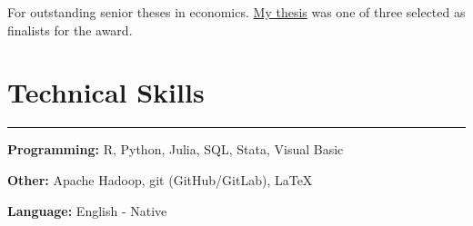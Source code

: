 \documentclass[
  letterpaper,
  DIV=11,
  numbers=noendperiod]{scrartcl}
\let\oldrule=\rule
\renewcommand{\rule}[1]{\oldrule{\linewidth}}
\begin{document}
For outstanding senior theses in economics.
\href{../assets/Graybill_Undergraduate_Thesis.pdf}{My thesis} was one of
three selected as finalists for the award.

\hypertarget{technical-skills}{%
\section{Technical Skills}\label{technical-skills}}

\begin{center}\rule{0.5\linewidth}{0.5pt}\end{center}

\textbf{Programming:} R, Python, Julia, SQL, Stata, Visual Basic

\textbf{Other:} Apache Hadoop, git (GitHub/GitLab), LaTeX

\textbf{Language:} English - Native
\end{document}
